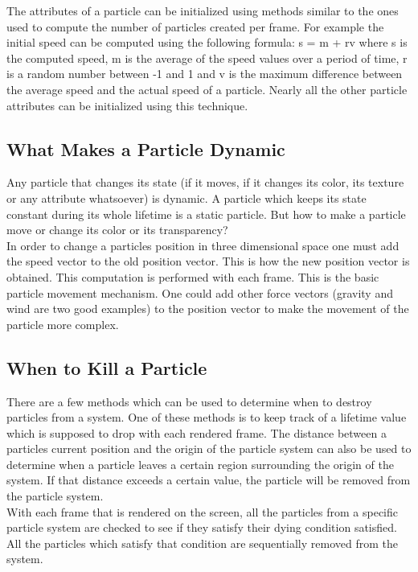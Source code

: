 The attributes of a particle can be initialized using methods similar to the ones used to compute the number of particles created per frame. For example the initial speed can be computed using the following formula: s = m + rv where s is the computed speed, m is the average of the speed values over a period of time, r is a random number between -1 and 1 and v is the maximum difference between the average speed and the actual speed of a particle. Nearly all the other particle attributes can be initialized using this technique.\\

\newpage
\subsection{What Makes a Particle Dynamic}
Any particle that changes its state (if it moves, if it changes its color, its texture or any attribute whatsoever) is dynamic. A particle which keeps its state constant during its whole lifetime is a static particle. But how to make a particle move or change its color or its transparency?\\

In order to change a particles position in three dimensional space one must add the speed vector to the old position vector. This is how the new position vector is obtained. This computation is performed with each frame. This is the basic particle movement mechanism. One could add other force vectors (gravity and wind are two good examples) to the position vector to make the movement of the particle more complex.\\

\newpage
\subsection{When to Kill a Particle}
There are a few methods which can be used to determine when to destroy particles from a system. One of these methods is to keep track of a lifetime value which is supposed to drop with each rendered frame. The distance between a particles current position and the origin of the particle system can also be used to determine when a particle leaves a certain region surrounding the origin of the system. If that distance exceeds a certain value, the particle will be removed from the particle system.\\

With each frame that is rendered on the screen, all the particles from a specific particle system are checked to see if they satisfy their dying condition satisfied. All the particles which satisfy that condition are sequentially removed from the system.

